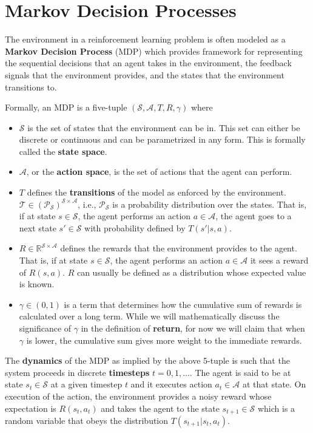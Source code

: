 \section{Markov Decision Processes}

The environment in a reinforcement learning problem is often modeled as a \textbf{Markov Decision Process} (MDP) which provides framework for representing the sequential decisions that an agent takes in the environment, the feedback signals that the environment provides, and the states that the environment transitions to. \\

\begin{dfn}
Formally, an MDP is a five-tuple $(\mathcal{S},\mathcal{A},T,R, \gamma)$ where 
\begin{itemize}
\item $\mathcal{S}$ is the set of states that the environment can be in. This set can either be discrete or continuous and can be parametrized in any form. This is formally called  the \textbf{state space}.
\item $\mathcal{A}$, or the \textbf{action space},  is the set of actions that the agent can perform. 
\item $T$ defines the \textbf{transitions} of the model as enforced by the environment. $\mathcal{T} \in (\mathcal{P}_{\mathcal{S}})^{\mathcal{S} \times \mathcal{A}}$, i.e., $\mathcal{P}_{\mathcal{S}}$ is a probability distribution over the states. That is, if at state $s \in \mathcal{S}$, the agent performs an action $a \in \mathcal{A}$, the agent goes to a next state $s' \in \mathcal{S}$ with probability defined by $T(s' | s,a)$.
\item $R \in \mathbb{R}^{\mathcal{S} \times \mathcal{A}}$ defines the rewards that the environment provides to the agent. That is, if at state $s \in \mathcal{S}$, the agent performs an action $a \in \mathcal{A}$ it sees a reward of $R(s,a)$. $R$ can usually be defined as a distribution whose expected value is known. 
\item $\gamma \in (0,1)$ is a term that determines how the cumulative sum of rewards is calculated over a long term. While we will mathematically discuss the significance of $\gamma$ in the definition of \textbf{return}, for now we will claim that when $\gamma$ is lower, the cumulative sum gives more weight to the immediate rewards.
\end{itemize}
\end{dfn}

The \textbf{dynamics} of the MDP as implied by the above 5-tuple is such that the system proceeds in discrete \textbf{timesteps} $t = 0, 1, \hdots $. The agent is said to be at state $s_t \in \mathcal{S}$ at a given timestep $t$ and it executes action $a_t \in \mathcal{A}$ at that state. On execution of the action, the environment provides a noisy reward whose expectation is $R(s_t,a_t)$ and takes the agent to the state $s_{t+1} \in \mathcal{S}$ which is a random variable that obeys the distribution $T(s_{t+1} | s_t, a_t)$.\\

